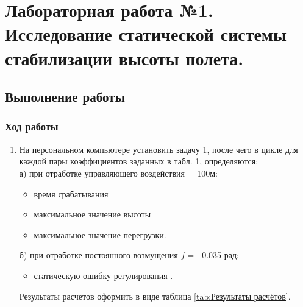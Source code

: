 \documentclass[a4paper,12pt]{article}
\begin{document}
\section{Лабораторная работа №1. Исследование статической системы стабилизации высоты полета.}
\subsection{Выполнение работы}
    \subsubsection{Ход работы}
    
    \begin{enumerate}
    \item На персональном компьютере установить задачу 1, после чего в цикле для
    каждой   пары   коэффициентов  заданных   в  табл.   1,
    определяются:\\
    а)	при отработке управляющего воздействия  = 100м:
        \begin{itemize}
            \item время срабатывания   
            \item максимальное значение высоты  
            \item максимальное значение перегрузки.
        \end{itemize}
    б)	при отработке постоянного возмущения $f=$ -0.035 рад:
        \begin{itemize}
            \item статическую ошибку регулирования .
        \end{itemize}
    
    Результаты расчетов оформить в виде таблица \ref{tab:Результаты расчётов}.


\end{enumerate}
\end{document}
